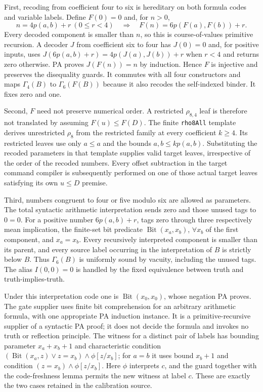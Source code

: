 First, recoding from coefficient four to six is hereditary on both
formula codes and variable labels. Define $F(0)=0$ and, for $n>0$,
\[
 n=4p(a,b)+r\ (0\leq r<4)\quad\Longrightarrow\quad
 F(n)=6p(F(a),F(b))+r.
\]
Every decoded component is smaller than $n$, so this is course-of-values
primitive recursion. A decoder $J$ from coefficient six to four has
$J(0)=0$ and, for positive inputs, uses
$J(6p(a,b)+r)=4p(J(a),J(b))+r$ when $r<4$ and returns zero otherwise.
PA proves $J(F(n))=n$ by induction. Hence $F$ is injective and preserves
the disequality guards. It commutes with all four constructors and maps
$\Gamma_4(B)$ to $\Gamma_6(F(B))$ because it also recodes the self-indexed
binder. It fixes zero and one.

Second, $F$ need not preserve numerical order. A restricted
$\rho_{8,4}$ leaf is therefore not translated by assuming
$F(u)\leq F(D)$. The finite \texttt{rho8All} template derives
unrestricted $\rho_8$ from the restricted family at every coefficient
$k\geq4$. Its restricted leaves use only $a\leq a$ and the bounds
$a,b\leq kp(a,b)$. Substituting the recoded parameters in that template
supplies valid target leaves, irrespective of the order of the recoded
numbers. Every offset subtraction in the target command compiler is
subsequently performed on one of those actual target leaves satisfying
its own $u\leq D$ premise.

Third, numbers congruent to four or five modulo six are allowed as
parameters. The total syntactic arithmetic interpretation sends zero
and those unused tags to $0=0$. For a positive number $6p(a,b)+r$, tags
zero through three respectively mean implication, the finite-set bit
predicate $\operatorname{Bit}(x_a,x_b)$, $\forall x_b$ of the first
component, and $x_a=x_b$. Every recursively interpreted component is
smaller than its parent, and every source label occurring in the
interpretation of $B$ is strictly below $B$. Thus $\Gamma_6(B)$ is
uniformly sound by vacuity, including the unused tags. The alias
$I(0,0)=0$ is handled by the fixed equivalence between truth and
truth-implies-truth.

Under this interpretation code one is $\operatorname{Bit}(x_0,x_0)$,
whose negation PA proves. The gate supplier uses finite bit comprehension
for an arbitrary arithmetic formula, with one appropriate PA induction
instance. It is a primitive-recursive supplier of a syntactic PA proof;
it does not decide the formula and invokes no truth or reflection
principle. The witness for a distinct pair of labels has bounding
parameter $x_a+x_b+1$ and characteristic condition
$(\operatorname{Bit}(x_a,z)\vee z=x_b)\wedge\phi[z/x_b]$;
for $a=b$ it uses bound $x_b+1$ and condition
$(z=x_b)\wedge\phi[z/x_b]$. Here $\phi$ interprets $c$,
and the guard together with the code-freshness lemma permits the
new witness at label $c$. These are exactly the two cases retained
in the calibration source.

